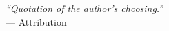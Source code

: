 \chapter*{}


\vspace*{\fill}
\begin{flushright}
    \textit{``Quotation of the author's choosing.''}\\
    --- Attribution
\end{flushright}
\vspace*{\fill}
